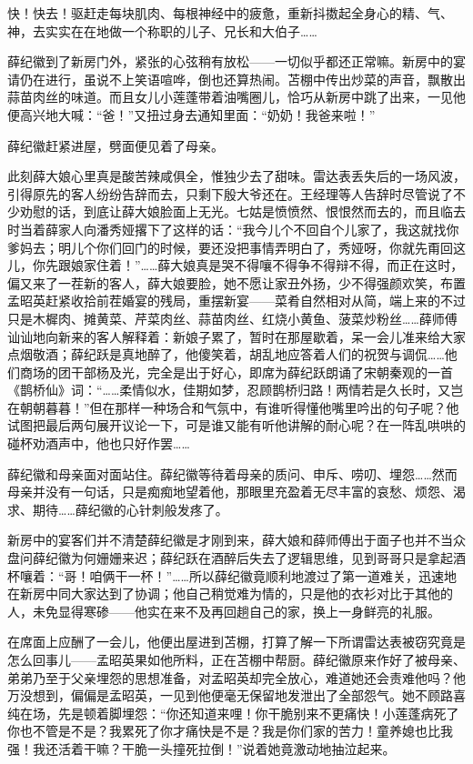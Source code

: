 \par 快！快去！驱赶走每块肌肉、每根神经中的疲惫，重新抖擞起全身心的精、气、神，去实实在在地做一个称职的儿子、兄长和大伯子……
\par 薛纪徽到了新房门外，紧张的心弦稍有放松——一切似乎都还正常嘛。新房中的宴请仍在进行，虽说不上笑语喧哗，倒也还算热闹。苫棚中传出炒菜的声音，飘散出蒜苗肉丝的味道。而且女儿小莲蓬带着油嘴圈儿，恰巧从新房中跳了出来，一见他便高兴地大喊：“爸！”又扭过身去通知里面：“奶奶！我爸来啦！”
\par 薛纪徽赶紧进屋，劈面便见着了母亲。
\par 此刻薛大娘心里真是酸苦辣咸俱全，惟独少去了甜味。雷达表丢失后的一场风波，引得原先的客人纷纷告辞而去，只剩下殷大爷还在。王经理等人告辞时尽管说了不少劝慰的话，到底让薛大娘脸面上无光。七姑是愤愤然、恨恨然而去的，而且临去时当着薛家人向潘秀娅撂下了这样的话：“我今儿个不回自个儿家了，我这就找你爹妈去；明儿个你们回门的时候，要还没把事情弄明白了，秀娅呀，你就先甭回这儿，你先跟娘家住着！”……薛大娘真是哭不得嚷不得争不得辩不得，而正在这时，偏又来了一茬新的客人，薛大娘要脸，她不愿让家丑外扬，少不得强颜欢笑，布置孟昭英赶紧收拾前茬婚宴的残局，重摆新宴——菜肴自然相对从简，端上来的不过只是木樨肉、摊黄菜、芹菜肉丝、蒜苗肉丝、红烧小黄鱼、菠菜炒粉丝……薛师傅讪讪地向新来的客人解释着：新娘子累了，暂时在那屋歇着，呆一会儿准来给大家点烟敬酒；薛纪跃是真地醉了，他傻笑着，胡乱地应答着人们的祝贺与调侃……他们商场的团干部杨及光，完全是出于好心，即席为薛纪跃朗诵了宋朝秦观的一首《鹊桥仙》词：“……柔情似水，佳期如梦，忍顾鹊桥归路！两情若是久长时，又岂在朝朝暮暮！”但在那样一种场合和气氛中，有谁听得懂他嘴里吟出的句子呢？他试图把最后两句展开议论一下，可是谁又能有听他讲解的耐心呢？在一阵乱哄哄的碰杯劝酒声中，他也只好作罢……
\par 薛纪徽和母亲面对面站住。薛纪徽等待着母亲的质问、申斥、唠叨、埋怨……然而母亲并没有一句话，只是痴痴地望着他，那眼里充盈着无尽丰富的哀愁、烦怨、渴求、期待……薛纪徽的心针刺般发疼了。
\par 新房中的宴客们并不清楚薛纪徽是才刚到来，薛大娘和薛师傅出于面子也并不当众盘问薛纪徽为何姗姗来迟；薛纪跃在酒醉后失去了逻辑思维，见到哥哥只是拿起酒杯嚷着：“哥！咱俩干一杯！”……所以薛纪徽竟顺利地渡过了第一道难关，迅速地在新房中同大家达到了协调；他自己稍觉难为情的，只是他的衣衫对比于其他的人，未免显得寒碜——他实在来不及再回趟自己的家，换上一身鲜亮的礼服。
\par 在席面上应酬了一会儿，他便出屋进到苫棚，打算了解一下所谓雷达表被窃究竟是怎么回事儿——孟昭英果如他所料，正在苫棚中帮厨。薛纪徽原来作好了被母亲、弟弟乃至于父亲埋怨的思想准备，对孟昭英却完全放心，难道她还会责难他吗？他万没想到，偏偏是孟昭英，一见到他便毫无保留地发泄出了全部怨气。她不顾路喜纯在场，先是顿着脚埋怨：“你还知道来哩！你干脆别来不更痛快！小莲蓬病死了你也不管是不是？我累死了你才痛快是不是？我是你们家的苦力！童养媳也比我强！我还活着干嘛？干脆一头撞死拉倒！”说着她竟激动地抽泣起来。
